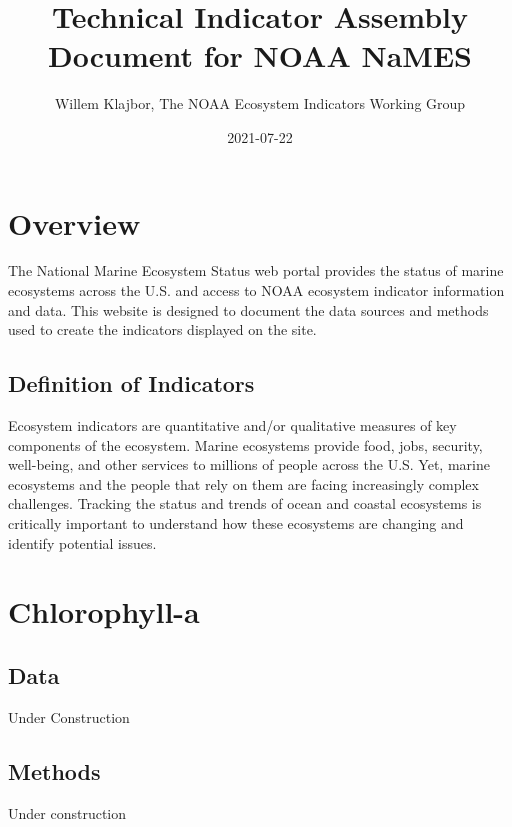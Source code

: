 \documentclass[
]{book}
\title{Technical Indicator Assembly Document for NOAA NaMES}
\author{Willem Klajbor, The NOAA Ecosystem Indicators Working Group}
\date{2021-07-22}
\begin{document}
\maketitle

{
\setcounter{tocdepth}{1}
\tableofcontents
}
\hypertarget{overview}{%
\chapter*{Overview}\label{overview}}

The National Marine Ecosystem Status web portal provides the status of marine ecosystems across the U.S. and access to NOAA ecosystem indicator information and data. This website is designed to document the data sources and methods used to create the indicators displayed on the site.

\hypertarget{definition-of-indicators}{%
\section{Definition of Indicators}\label{definition-of-indicators}}

Ecosystem indicators are quantitative and/or qualitative measures of key components of the ecosystem. Marine ecosystems provide food, jobs, security, well-being, and other services to millions of people across the U.S. Yet, marine ecosystems and the people that rely on them are facing increasingly complex challenges. Tracking the status and trends of ocean and coastal ecosystems is critically important to understand how these ecosystems are changing and identify potential issues.

\hypertarget{chlorophyll-a}{%
\chapter{Chlorophyll-a}\label{chlorophyll-a}}

\hypertarget{data}{%
\section{Data}\label{data}}

Under Construction

\hypertarget{methods}{%
\section{Methods}\label{methods}}

Under construction
\end{document}

